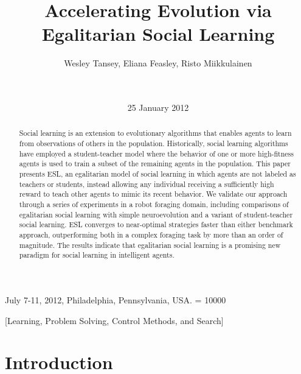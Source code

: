 \documentclass{sig-alternate}
\begin{document}
 {July 7-11, 2012, Philadelphia, Pennsylvania, USA.}
\widowpenalty = 10000
    
\title{Accelerating Evolution via Egalitarian Social Learning}

\author{
\alignauthor
Wesley Tansey, Eliana Feasley, Risto Miikkulainen\\
       \\
       \\
}
\date{25 January 2012}

\maketitle
\begin{abstract}
Social learning is an extension to evolutionary algorithms that enables agents to learn from observations of others in the population. Historically, social learning algorithms have employed a student-teacher model where the behavior of one or more high-fitness agents is used to train a subset of the remaining agents in the population. This paper presents ESL, an egalitarian model of social learning in which agents are not labeled as teachers or students, instead allowing any individual receiving a sufficiently high reward to teach other agents to mimic its recent behavior. We validate our approach through a series of experiments in a robot foraging domain, including comparisons of egalitarian social learning with simple neuroevolution and a variant of student-teacher social learning. ESL converges to near-optimal strategies faster than either benchmark approach, outperforming both in a complex foraging task by more than an order of magnitude. The results indicate that egalitarian social learning is a promising new paradigm for social learning in intelligent agents.
\end{abstract}

[Learning, Problem Solving, Control Methods, and Search]



\section{Introduction}
\end{document}

